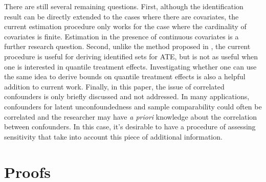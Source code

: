 \documentclass[12pt]{article}
\begin{document}
  There are still several remaining questions. 
  First, although the identification result can be directly extended to the cases where there are covariates, the current estimation procedure only works for the case where the cardinality of covariates is finite. Estimation in the presence of continuous covariates is a further research question. Second, unlike the method proposed in \textcite{masten2018identification}, 
  the current procedure is useful for deriving identified sets for ATE, but is not as useful when one is interested in quantile treatment effects. Investigating whether one can use the same idea to derive bounds on quantile treatment effects is also a helpful addition to current work. Finally, in this paper, the issue of correlated confounders is only briefly discussed and not addressed. In many applications, confounders for latent unconfoundedness and sample comparability could often be correlated and the researcher may have \textit{a priori} knowledge about the correlation between confounders. In this case, it's desirable to have a procedure of assessing sensitivity that take into account this piece of additional information. 
    
	\medskip
	
	\pagebreak
	\nocite{*}
	\printbibliography
	
	\pagebreak
	\appendix
	\section{Proofs}

	
	\duality*
	
\end{document}
